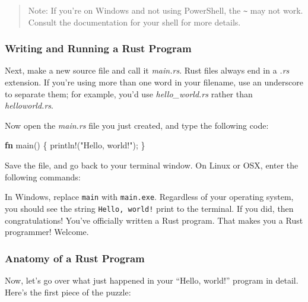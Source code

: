 \documentclass[a4paper,]{book}
\newenvironment{Shaded}{\begin{snugshade}}{\end{snugshade}}
\newcommand{\KeywordTok}[1]{\textcolor[rgb]{0.13,0.29,0.53}{\textbf{{#1}}}}
\newcommand{\StringTok}[1]{\textcolor[rgb]{0.31,0.60,0.02}{{#1}}}
\newcommand{\OtherTok}[1]{\textcolor[rgb]{0.56,0.35,0.01}{{#1}}}
\newcommand{\NormalTok}[1]{{#1}}
\begin{document}
\begin{quote}
Note: If you're on Windows and not using PowerShell, the
\texttt{\textasciitilde{}} may not work. Consult the documentation for
your shell for more details.
\end{quote}

\subsubsection{Writing and Running a Rust
Program}\label{writing-and-running-a-rust-program}

Next, make a new source file and call it \emph{main.rs}. Rust files
always end in a \emph{.rs} extension. If you're using more than one word
in your filename, use an underscore to separate them; for example, you'd
use \emph{hello\_world.rs} rather than \emph{helloworld.rs}.

Now open the \emph{main.rs} file you just created, and type the
following code:

\begin{Shaded}
\begin{Highlighting}[]
\KeywordTok{fn} \NormalTok{main() \{}
    \OtherTok{println!}\NormalTok{(}\StringTok{"Hello, world!"}\NormalTok{);}
\NormalTok{\}}
\end{Highlighting}
\end{Shaded}

Save the file, and go back to your terminal window. On Linux or OSX,
enter the following commands:

\begin{Shaded}
\end{Shaded}

In Windows, replace \texttt{main} with \texttt{main.exe}. Regardless of
your operating system, you should see the string \texttt{Hello,\ world!}
print to the terminal. If you did, then congratulations! You've
officially written a Rust program. That makes you a Rust programmer!
Welcome.

\subsubsection{Anatomy of a Rust
Program}\label{anatomy-of-a-rust-program}

Now, let's go over what just happened in your ``Hello, world!'' program
in detail. Here's the first piece of the puzzle:
\end{document}
